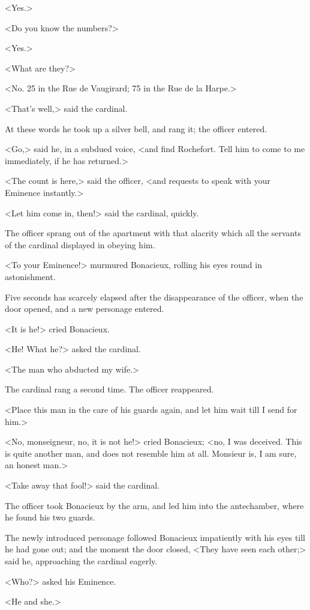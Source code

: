 <Yes.> 

<Do you know the numbers?> 

<Yes.> 

<What are they?> 

<No. 25 in the Rue de Vaugirard; 75 in the Rue de la Harpe.> 

<That's well,> said the cardinal. 

At these words he took up a silver bell, and rang it; the officer entered. 

<Go,> said he, in a subdued voice, <and find Rochefort. Tell him to come to me immediately, if he has returned.> 

<The count is here,> said the officer, <and requests to speak with your Eminence instantly.> 

<Let him come in, then!> said the cardinal, quickly. 

The officer sprang out of the apartment with that alacrity which all the servants of the cardinal displayed in obeying him. 

<To your Eminence!> murmured Bonacieux, rolling his eyes round in astonishment. 

Five seconds has scarcely elapsed after the disappearance of the officer, when the door opened, and a new personage entered. 

<It is he!> cried Bonacieux. 

<He! What he?> asked the cardinal. 

<The man who abducted my wife.> 

The cardinal rang a second time. The officer reappeared. 

<Place this man in the care of his guards again, and let him wait till I send for him.> 

<No, monseigneur, no, it is not he!> cried Bonacieux; <no, I was deceived. This is quite another man, and does not resemble him at all. Monsieur is, I am sure, an honest man.> 

<Take away that fool!> said the cardinal. 

The officer took Bonacieux by the arm, and led him into the antechamber, where he found his two guards. 

The newly introduced personage followed Bonacieux impatiently with his eyes till he had gone out; and the moment the door closed, <They have seen each other;> said he, approaching the cardinal eagerly. 

<Who?> asked his Eminence. 

<He and she.> 

